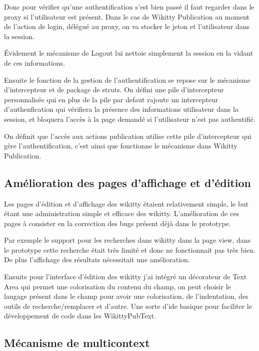 Donc pour vérifier qu'une authentification s'est bien passé il faut regarder
dans le proxy si l'utilisateur est présent. Dans le cas de Wikitty Publication
au moment de l'action de login, délégué au proxy, on va stocker le jeton et
l'utilisateur dans la session.

Évidement le mécanisme de Logout lui nettoie simplement la session en la vidant
de ces informations.

Ensuite le fonction de la gestion de l'authentification se repose sur le
mécanisme d'intercepteur et de package de struts. On défini une pile
d'intercepteur personnalisée qui en plus de la pile par defaut rajoute un
intercepteur d'authenfication qui vérifiera la présence des informations
utilisateur dans la session, et bloquera l'accès à la page demandé si
l'utilisateur n'est pas authentifié.

On définit que l'accès aux actions publication utilise cette pile d'intercepteur
qui gère l'authentification, c'est ainsi que fonctionne le mécanisme dans
Wikitty Publication.

\subsection{Amélioration des pages d'affichage et d'édition}

Les pages d'édition et d'affichage des wikitty étaient relativement simple, le
but étant une administration simple et efficace des wikitty. L'amélioration de
ces pages à consister en la correction des bugs présent déjà dans le prototype.

Par exemple le support pour les recherches dans wikitty dans la page view,
dans le prototype cette recherche était très limité et donc ne fonctionnait pas
très bien. De plus l'affichage des résultats nécessitait une amélioration.

Ensuite pour l'interface d'édition des wikitty j'ai intégré un décorateur de
Text Area qui permet une colorisation du contenu du champ, on peut choisir le
langage présent dans le champ pour avoir une colorisation, de l'indentation, des
outils de recherche/remplacer et d'autre. Une sorte d'ide basique pour
faciliter le développement de code dans les WikittyPubText.



\subsection{Mécanisme de multicontext}

